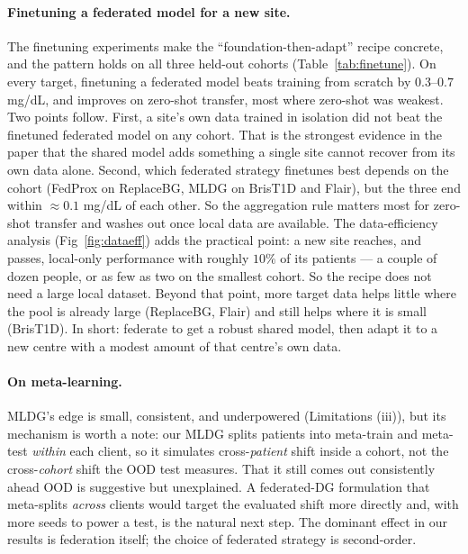 \documentclass[10pt,letterpaper]{article}
\begin{document}
\paragraph{Finetuning a federated model for a new site.} The finetuning
experiments make the ``foundation-then-adapt'' recipe concrete, and the
pattern holds on all three held-out cohorts (Table~\ref{tab:finetune}). On
every target, finetuning a federated model beats training from scratch by
$0.3$--$0.7$ mg/dL, and improves on zero-shot transfer, most where zero-shot
was weakest. Two points follow. First, a site's own data trained in isolation
did not beat the finetuned federated model on any cohort. That is the
strongest evidence in the paper that the shared model adds something a single
site cannot recover from its own data alone. Second, which federated strategy
finetunes best depends on the cohort (FedProx on ReplaceBG, MLDG on BrisT1D and
Flair), but the three end within $\approx 0.1$ mg/dL of each other. So the
aggregation rule matters most for zero-shot transfer and washes out once
local data are available. The data-efficiency analysis
(Fig~\ref{fig:dataeff}) adds the practical point: a new site reaches, and
passes, local-only performance with roughly $10\%$ of its patients --- a
couple of dozen people, or as few as two on the smallest cohort. So the
recipe does not need a large local dataset. Beyond that point, more target
data helps little where the pool is already large (ReplaceBG, Flair) and
still helps where it is small (BrisT1D). In short: federate to get a robust
shared model, then adapt it to a new centre with a modest amount of that
centre's own data.

\paragraph{On meta-learning.} MLDG's edge is small, consistent, and
underpowered (Limitations (iii)), but its mechanism is worth a note: our MLDG
splits patients into meta-train and meta-test \emph{within} each client, so it
simulates cross-\emph{patient} shift inside a cohort, not the
cross-\emph{cohort} shift the OOD test measures. That it still comes out
consistently ahead OOD is suggestive but unexplained. A federated-DG
formulation that meta-splits \emph{across} clients would target the evaluated
shift more directly and, with more seeds to power a test, is the natural next
step. The dominant effect in our results is federation itself; the choice of
federated strategy is second-order.
\end{document}

